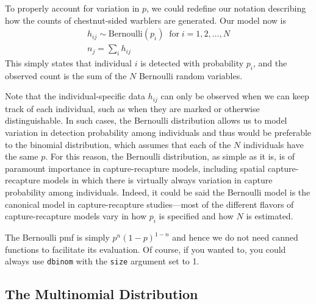
To properly account for variation in $p$, we could redefine our notation
describing how the counts of chestnut-sided warblers are
generated. Our model now is
\begin{gather}
h_{ij} \sim \text{Bernoulli}(p_i) \;\; \text{for} \; i=1,2,\dots,N \\
n_j = \sum_i h_{ij}
\label{modeling.eq.Bern}
\end{gather}
This simply states that individual $i$ is detected with probability
$p_i$, and the observed count is the sum of the $N$ Bernoulli random
variables.

Note that the individual-specific data $h_{ij}$ can only be
observed when we can keep track of each individual, such as when they
are marked or otherwise distinguishable.
In such cases, the Bernoulli distribution allows us to
model variation in detection probability among individuals and thus
would be preferable to the binomial distribution, which assumes that each
of the $N$ individuals have the same $p$.
For this reason, the Bernoulli
distribution, as simple as it is, is of paramount importance in
capture-recapture models, including spatial capture-recapture models
in which there is virtually always variation in capture probability
among individuals. Indeed, it could be said the Bernoulli model is the
canonical model in capture-recapture studies---most of the
different flavors of capture-recapture models vary in how $p_i$ is
specified and how $N$ is estimated.

The Bernoulli pmf is simply $p^n(1-p)^{1-n}$ and hence we do not need canned
functions to facilitate its evaluation. Of course, if you wanted to, you
could always use \verb+dbinom+ with the \verb+size+ argument set to
1.

\subsection{The Multinomial Distribution}



